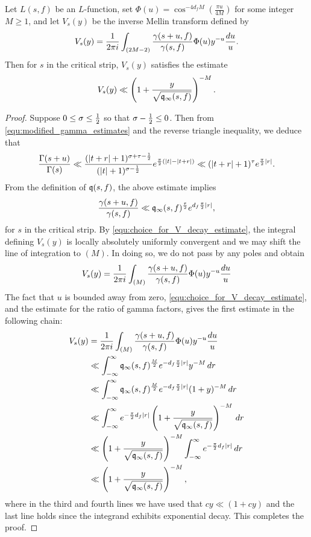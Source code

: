     \begin{proposition}\label{prop:V_function_decay}
      Let $L(s,f)$ be an $L$-function, set $\Phi(u) = \cos^{-4d_{f}M}\left(\frac{\pi u}{4M}\right)$ for some integer $M \ge 1$, and let $V_{s}(y)$ be the inverse Mellin transform defined by
      \[
        V_{s}(y) = \frac{1}{2\pi i}\int_{(2M-2)}\frac{\gamma(s+u,f)}{\gamma(s,f)}\Phi(u)y^{-u}\frac{du}{u}.
      \]
      Then for $s$ in the critical strip, $V_{s}(y)$ satisfies the estimate
      \[
        V_{s}(y) \ll \left(1+\frac{y}{\sqrt{\mathfrak{q}_{\infty}(s,f)}}\right)^{-M}.
      \]
    \end{proposition}
    \begin{proof}
      Suppose $0 \le \sigma \le \frac{1}{2}$ so that $\sigma-\frac{1}{2} \le 0$. Then from \cref{equ:modified_gamma_estimates} and the reverse triangle inequality, we deduce that
      \[
        \frac{\Gamma(s+u)}{\Gamma(s)} \ll \frac{(|t+r|+1)^{\sigma+\tau-\frac{1}{2}}}{(|t|+1)^{\sigma-\frac{1}{2}}}e^{\frac{\pi}{2}(|t|-|t+r|)} \ll (|t+r|+1)^{\tau}e^{\frac{\pi}{2}|r|}.
      \]
      From the definition of $\mathfrak{q}(s,f)$, the above estimate implies
      \[
        \frac{\gamma(s+u,f)}{\gamma(s,f)} \ll \mathfrak{q}_{\infty}(s,f)^{\frac{\tau}{2}}e^{d_{f}\frac{\pi}{2}|r|},
      \]
      for $s$ in the critical strip. By \cref{equ:choice_for_V_decay_estimate}, the integral defining $V_{s}(y)$ is locally absolutely uniformly convergent and we may shift the line of integration to $(M)$. In doing so, we do not pass by any poles and obtain
      \[
        V_{s}(y) = \frac{1}{2\pi i}\int_{(M)}\frac{\gamma(s+u,f)}{\gamma(s,f)}\Phi(u)y^{-u}\frac{du}{u} \\
      \]
      The fact that $u$ is bounded away from zero, \cref{equ:choice_for_V_decay_estimate}, and the estimate for the ratio of gamma factors, gives the first estimate in the following chain:
      \begin{align*}
        V_{s}(y) &= \frac{1}{2\pi i}\int_{(M)}\frac{\gamma(s+u,f)}{\gamma(s,f)}\Phi(u)y^{-u}\frac{du}{u} \\
        &\ll \int_{-\infty}^{\infty}\mathfrak{q}_{\infty}(s,f)^{\frac{M}{2}}e^{-d_{f}\frac{\pi}{2}|r|}y^{-M}\,dr \\
        &\ll \int_{-\infty}^{\infty}\mathfrak{q}_{\infty}(s,f)^{\frac{M}{2}}e^{-d_{f}\frac{\pi}{2}|r|}(1+y)^{-M}\,dr \\
        &\ll \int_{-\infty}^{\infty}e^{-\frac{\pi}{2}d_{f}|r|}\left(1+\frac{y}{\sqrt{\mathfrak{q}_{\infty}(s,f)}}\right)^{-M}\,dr \\
        &\ll \left(1+\frac{y}{\sqrt{\mathfrak{q}_{\infty}(s,f)}}\right)^{-M}\int_{-\infty}^{\infty}e^{-\frac{\pi}{2}d_{f}|r|}\,dr \\
        &\ll \left(1+\frac{y}{\sqrt{\mathfrak{q}_{\infty}(s,f)}}\right)^{-M},
      \end{align*}
      where in the third and fourth lines we have used that $cy \ll (1+cy)$ and the last line holds since the integrand exhibits exponential decay. This completes the proof.
    \end{proof}

